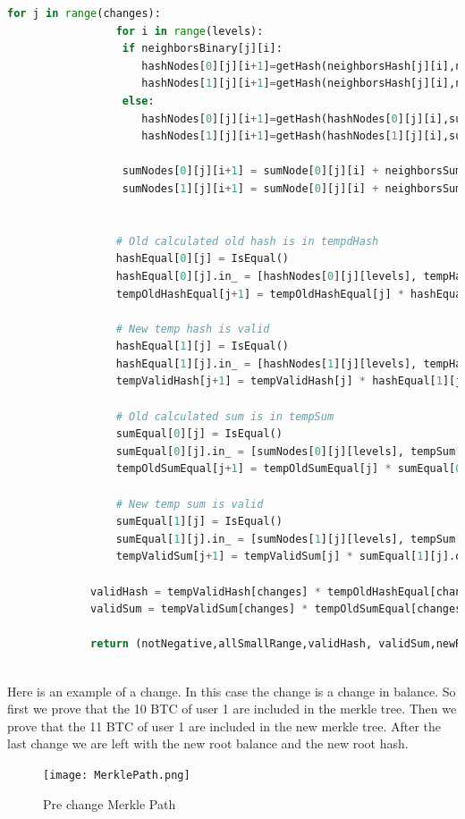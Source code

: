 \begin{lstlisting}[language=Python, caption=Liabilities change circuit pseudocode]
             for j in range(changes):
                 for i in range(levels):
                  if neighborsBinary[j][i]:
                     hashNodes[0][j][i+1]=getHash(neighborsHash[j][i],neighborsSum[j][i],hashNodes[0][j][i],sumNode[0][j][i])
                     hashNodes[1][j][i+1]=getHash(neighborsHash[j][i],neighborsSum[j][i],hashNodes[1][j][i],sumNode[1][j][i])
                  else:
                     hashNodes[0][j][i+1]=getHash(hashNodes[0][j][i],sumNode[0][j][i],neighborsHash[j][i],neighborsSum[j][i])
                     hashNodes[1][j][i+1]=getHash(hashNodes[1][j][i],sumNode[1][j][i],neighborsHash[j][i],neighborsSum[j][i])

                  sumNodes[0][j][i+1] = sumNode[0][j][i] + neighborsSum[j][i]
                  sumNodes[1][j][i+1] = sumNode[0][j][i] + neighborsSum[j][i]
                     
         
                 # Old calculated old hash is in tempdHash
                 hashEqual[0][j] = IsEqual()
                 hashEqual[0][j].in_ = [hashNodes[0][j][levels], tempHash[j]].out
                 tempOldHashEqual[j+1] = tempOldHashEqual[j] * hashEqual[0][j].out
         
                 # New temp hash is valid
                 hashEqual[1][j] = IsEqual()
                 hashEqual[1][j].in_ = [hashNodes[1][j][levels], tempHash[j+1]].out
                 tempValidHash[j+1] = tempValidHash[j] * hashEqual[1][j].out
         
                 # Old calculated sum is in tempSum
                 sumEqual[0][j] = IsEqual()
                 sumEqual[0][j].in_ = [sumNodes[0][j][levels], tempSum[j]].out
                 tempOldSumEqual[j+1] = tempOldSumEqual[j] * sumEqual[0][j].out
                 
                 # New temp sum is valid
                 sumEqual[1][j] = IsEqual()
                 sumEqual[1][j].in_ = [sumNodes[1][j][levels], tempSum[j+1]].out
                 tempValidSum[j+1] = tempValidSum[j] * sumEqual[1][j].out
         
             validHash = tempValidHash[changes] * tempOldHashEqual[changes]
             validSum = tempValidSum[changes] * tempOldSumEqual[changes]
         
             return (notNegative,allSmallRange,validHash, validSum,newRootHash,newSum)
         
      \end{lstlisting}

      Here is an example of a change. In this case the change is a change in balance. So first we prove that the 10 BTC of user 1 are 
      included in the merkle tree. Then we prove that the 11 BTC of user 1 are included in the new merkle tree. After the last change we are left
      with the new root balance and the new root hash.
      \begin{figure}[H]
         \centering
         \texttt{[image: MerklePath.png]}
         \caption{Pre change Merkle Path}
         \label{overflow}
         \end{figure}


